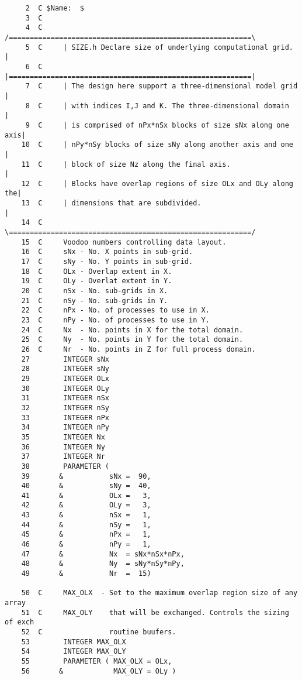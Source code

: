 \begin{verbatim}
     2	C $Name:  $
     3	C
     4	C     /==========================================================\
     5	C     | SIZE.h Declare size of underlying computational grid.    |
     6	C     |==========================================================|
     7	C     | The design here support a three-dimensional model grid   |
     8	C     | with indices I,J and K. The three-dimensional domain     |
     9	C     | is comprised of nPx*nSx blocks of size sNx along one axis|
    10	C     | nPy*nSy blocks of size sNy along another axis and one    |
    11	C     | block of size Nz along the final axis.                   |
    12	C     | Blocks have overlap regions of size OLx and OLy along the|
    13	C     | dimensions that are subdivided.                          |
    14	C     \==========================================================/
    15	C     Voodoo numbers controlling data layout.
    16	C     sNx - No. X points in sub-grid.
    17	C     sNy - No. Y points in sub-grid.
    18	C     OLx - Overlap extent in X.
    19	C     OLy - Overlat extent in Y.
    20	C     nSx - No. sub-grids in X.
    21	C     nSy - No. sub-grids in Y.
    22	C     nPx - No. of processes to use in X.
    23	C     nPy - No. of processes to use in Y.
    24	C     Nx  - No. points in X for the total domain.
    25	C     Ny  - No. points in Y for the total domain.
    26	C     Nr  - No. points in Z for full process domain.
    27	      INTEGER sNx
    28	      INTEGER sNy
    29	      INTEGER OLx
    30	      INTEGER OLy
    31	      INTEGER nSx
    32	      INTEGER nSy
    33	      INTEGER nPx
    34	      INTEGER nPy
    35	      INTEGER Nx
    36	      INTEGER Ny
    37	      INTEGER Nr
    38	      PARAMETER (
    39	     &           sNx =  90,
    40	     &           sNy =  40,
    41	     &           OLx =   3,
    42	     &           OLy =   3,
    43	     &           nSx =   1,
    44	     &           nSy =   1,
    45	     &           nPx =   1,
    46	     &           nPy =   1,
    47	     &           Nx  = sNx*nSx*nPx,
    48	     &           Ny  = sNy*nSy*nPy,
    49	     &           Nr  =  15)
       
    50	C     MAX_OLX  - Set to the maximum overlap region size of any array
    51	C     MAX_OLY    that will be exchanged. Controls the sizing of exch
    52	C                routine buufers.
    53	      INTEGER MAX_OLX
    54	      INTEGER MAX_OLY
    55	      PARAMETER ( MAX_OLX = OLx,
    56	     &            MAX_OLY = OLy )
\end{verbatim}
